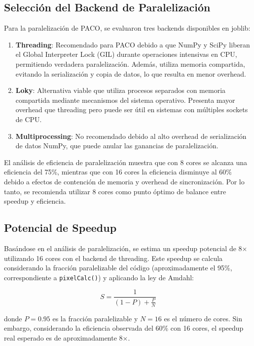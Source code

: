 \subsection{Selección del Backend de Paralelización}

Para la paralelización de PACO, se evaluaron tres backends disponibles en joblib:

\begin{enumerate}
    \item \textbf{Threading}: Recomendado para PACO debido a que NumPy y SciPy liberan el Global Interpreter Lock (GIL) durante operaciones intensivas en CPU, permitiendo verdadera paralelización. Además, utiliza memoria compartida, evitando la serialización y copia de datos, lo que resulta en menor overhead.
    
    \item \textbf{Loky}: Alternativa viable que utiliza procesos separados con memoria compartida mediante mecanismos del sistema operativo. Presenta mayor overhead que threading pero puede ser útil en sistemas con múltiples sockets de CPU.
    
    \item \textbf{Multiprocessing}: No recomendado debido al alto overhead de serialización de datos NumPy, que puede anular las ganancias de paralelización.
\end{enumerate}

El análisis de eficiencia de paralelización muestra que con 8 cores se alcanza una eficiencia del 75\%, mientras que con 16 cores la eficiencia disminuye al 60\% debido a efectos de contención de memoria y overhead de sincronización. Por lo tanto, se recomienda utilizar 8 cores como punto óptimo de balance entre speedup y eficiencia.

\subsection{Potencial de Speedup}

Basándose en el análisis de paralelización, se estima un speedup potencial de 8× utilizando 16 cores con el backend de threading. Este speedup se calcula considerando la fracción paralelizable del código (aproximadamente el 95\%, correspondiente a \texttt{pixelCalc()}) y aplicando la ley de Amdahl:

\begin{equation}
    S = \frac{1}{(1 - P) + \frac{P}{N}}
\end{equation}

donde $P = 0.95$ es la fracción paralelizable y $N = 16$ es el número de cores. Sin embargo, considerando la eficiencia observada del 60\% con 16 cores, el speedup real esperado es de aproximadamente 8×.

